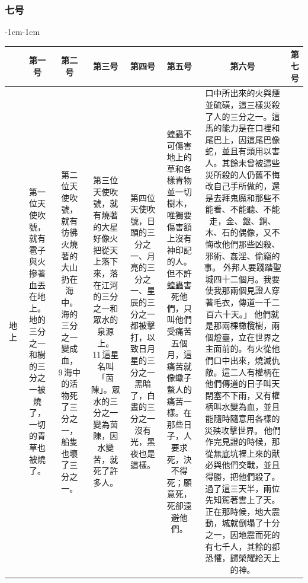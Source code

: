 \subsubsection{七号}
\begin{changemargin}{-1cm}{-1cm}
\begin{table} %
\centering
\begin{tabular}{cccccccc}\hline
&第一号 & 第二号 & 第三号&第四号 & 第五号&第六号  & 第七号  \\\hline
\multicolumn{1}{m{.3cm}|}{地上}&
\multicolumn{1}{m{1.3cm}|}{第一位天使吹號，就有雹子與火摻著血丟在地上。地的三分之一和樹的三分之一被燒了，一切的青草也被燒了。}  &
\multicolumn{1}{m{1.3cm}|}{第二位天使吹號，就有彷彿火燒著的大山扔在海中。海的三分之一變成血， 9 海中的活物死了三分之一，船隻也壞了三分之一。}  &
 \multicolumn{1}{m{1.8cm}|}{第三位天使吹號，就有燒著的大星好像火把從天上落下來，落在江河的三分之一和眾水的泉源上。 11 這星名叫「茵陳」。眾水的三分之一變為茵陳，因水變苦，就死了許多人。} &
 \multicolumn{1}{m{1.8cm}|}{第四位天使吹號，日頭的三分之一、月亮的三分之一、星辰的三分之一都被擊打，以致日月星的三分之一黑暗了，白晝的三分之一沒有光，黑夜也是這樣。}  &
 \multicolumn{1}{m{6cm}|}{蝗蟲不可傷害地上的草和各樣青物並一切樹木，唯獨要傷害額上沒有神印記的人。但不許蝗蟲害死他們，只叫他們受痛苦五個月，這痛苦就像蠍子螫人的痛苦一樣。在那些日子，人要求死，決不得死；願意死，死卻遠避他們。}   &
 \multicolumn{1}{m{8.cm}|}{口中所出來的火與煙並硫磺，這三樣災殺了人的三分之一。這馬的能力是在口裡和尾巴上，因這尾巴像蛇，並且有頭用以害人。其餘未曾被這些災所殺的人仍舊不悔改自己手所做的，還是去拜鬼魔和那些不能看、不能聽、不能走，金、銀、銅、木、石的偶像，又不悔改他們那些凶殺、邪術、姦淫、偷竊的事。
外邦人要踐踏聖城四十二個月。我要使我那兩個見證人穿著毛衣，傳道一千二百六十天。」 他們就是那兩棵橄欖樹，兩個燈臺，立在世界之主面前的。有火從他們口中出來，燒滅仇敵。這二人有權柄在他們傳道的日子叫天閉塞不下雨，又有權柄叫水變為血，並且能隨時隨意用各樣的災殃攻擊世界。 他們作完見證的時候，那從無底坑裡上來的獸必與他們交戰，並且得勝，把他們殺了。過了這三天半，兩位先知駕著雲上了天。正在那時候，地大震動，城就倒塌了十分之一，因地震而死的有七千人，其餘的都恐懼，歸榮耀給天上的神。}  &  
 \multicolumn{1}{m{1.5cm}|}{} \\\hline
 

\end{tabular}
\end{table}
\end{changemargin}

